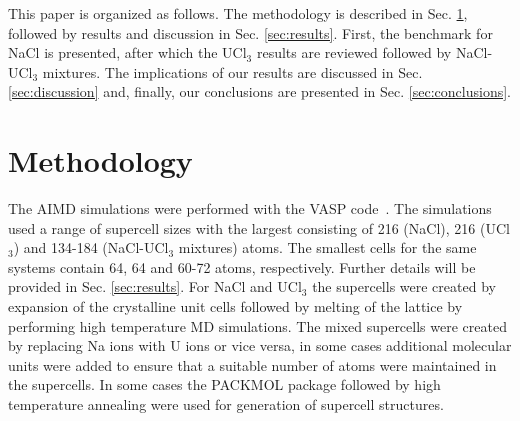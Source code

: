 \documentclass[preprint,3p,10pt,twocolumn,number,sort&compress]{elsarticle}
\begin{document}

This paper is organized as follows. The methodology is described in Sec. \ref{sec:method}, followed by results and discussion in Sec. \ref{sec:results}. First, the benchmark for NaCl is presented, after which the UCl$_3$ results are reviewed followed by NaCl-UCl$_3$ mixtures. The implications of our results are discussed in Sec. \ref{sec:discussion} and, finally, our conclusions are presented in Sec. \ref{sec:conclusions}. 

\section{Methodology}
\label{sec:method}
The AIMD simulations were performed with the VASP code~\cite{Kresse1996}. The simulations used a range of supercell sizes with the largest consisting of 216 (NaCl), 216 (UCl$_3$) and 134-184 (NaCl-UCl$_3$ mixtures) atoms. The smallest cells for the same systems contain 64, 64 and 60-72 atoms, respectively. Further details will be provided in Sec. \ref{sec:results}. 
For NaCl and UCl$_3$ the supercells were created by expansion of the crystalline unit cells followed by melting of the lattice by performing high temperature MD simulations. 
The mixed supercells were created by replacing Na ions with U ions or vice versa, in some cases additional molecular units were added to ensure that a suitable number of atoms were maintained in the supercells. {\color{red}In some cases the PACKMOL package followed by high temperature annealing were used for generation of supercell structures.} %
\end{document}
